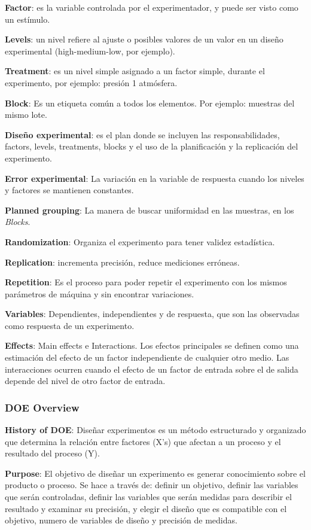 \documentclass[]{article}
\begin{document}
\textbf{Factor}: es la variable controlada por el experimentador, y puede ser visto como un estímulo.

\textbf{Levels}: un nivel refiere al ajuste o posibles valores de un valor en un diseño experimental (high-medium-low, por ejemplo).

\textbf{Treatment}: es un nivel simple asignado a un factor simple, durante el experimento, por ejemplo: presión 1 atmósfera.

\textbf{Block}: Es un etiqueta común a todos los elementos. Por ejemplo: muestras del mismo lote.

\textbf{Diseño experimental}: es el plan donde se incluyen las responsabilidades, factors, levels, treatments, blocks y el uso de la planificación y la replicación del experimento.

\textbf{Error experimental}: La variación en la variable de respuesta cuando los niveles y factores se mantienen constantes.

\textbf{Planned grouping}: La manera de buscar uniformidad en las muestras, en los \textit{Blocks}.

\textbf{Randomization}: Organiza el experimento para tener validez estadística.

\textbf{Replication}: incrementa precisión, reduce mediciones erróneas.

\textbf{Repetition}: Es el proceso para poder repetir el experimento con los mismos parámetros de máquina y sin encontrar variaciones.

\textbf{Variables}: Dependientes, independientes y de respuesta, que son las observadas como respuesta de un experimento.

\textbf{Effects}: Main effects e Interactions. Los efectos principales se definen como una estimación del efecto de un factor independiente de cualquier otro medio. Las interacciones ocurren cuando el efecto de un factor de entrada sobre el de salida depende del nivel de otro factor de entrada.

\subsubsection{DOE Overview}

\textbf{History of DOE}: Diseñar experimentos es un método estructurado y organizado que determina la relación entre factores (X's) que afectan a un proceso y el resultado del proceso (Y).

\textbf{Purpose}: El objetivo de diseñar un experimento es generar conocimiento sobre el producto o proceso. Se hace a través de: definir un objetivo, definir las variables que serán controladas, definir las variables que serán medidas para describir el resultado y examinar su precisión, y elegir el diseño que es compatible con el objetivo, numero de variables de diseño y precisión de medidas.
\end{document}
